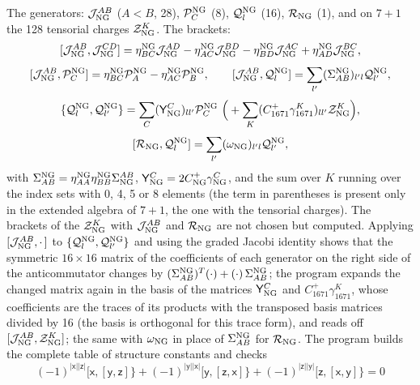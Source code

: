 \documentclass[
  10pt,
]{article}
\begin{document}
The generators: \(\mathcal J^{AB}_{\rm NG}\) (\(A<B\), 28),
\(\mathcal P^{\rm NG}_C\) (8), \(\mathcal Q^{\rm NG}_l\) (16),
\(\mathcal R_{\rm NG}\) (1), and on \(7+1\) the 128 tensorial charges
\(\mathcal Z^K_{\rm NG}\). The brackets:
\[[\mathcal J^{AB}_{\rm NG},\mathcal J^{CD}_{\rm NG}]=\eta^{\rm NG}_{BC}\mathcal J^{AD}_{\rm NG}-\eta^{\rm NG}_{AC}\mathcal J^{BD}_{\rm NG}-\eta^{\rm NG}_{BD}\mathcal J^{AC}_{\rm NG}+\eta^{\rm NG}_{AD}\mathcal J^{BC}_{\rm NG},\]
\[[\mathcal J^{AB}_{\rm NG},\mathcal P^{\rm NG}_C]=\eta^{\rm NG}_{BC}\mathcal P^{\rm NG}_A-\eta^{\rm NG}_{AC}\mathcal P^{\rm NG}_B,\qquad
[\mathcal J^{AB}_{\rm NG},\mathcal Q^{\rm NG}_l]=\sum_{l'}(\Sigma^{\rm NG}_{AB})_{l'l}\mathcal Q^{\rm NG}_{l'},\]
\[\{\mathcal Q^{\rm NG}_l,\mathcal Q^{\rm NG}_{l'}\}=\sum_C(\mathsf Y^C_{\rm NG})_{ll'}\mathcal P^{\rm NG}_C\ \Big(+\sum_K(C^+_{1671}\gamma^K_{1671})_{ll'}\mathcal Z^K_{\rm NG}\Big),\]
\[[\mathcal R_{\rm NG},\mathcal Q^{\rm NG}_l]=\sum_{l'}(\omega_{\rm NG})_{l'l}\mathcal Q^{\rm NG}_{l'},\]
with
\(\Sigma^{\rm NG}_{AB}=\eta^{\rm NG}_{AA}\eta^{\rm NG}_{BB}\Sigma^{AB}_{\rm NG}\),
\(\mathsf Y^C_{\rm NG}=2C^+_{\rm NG}\gamma^C_{\rm NG}\), and the sum
over \(K\) running over the index sets with 0, 4, 5 or 8 elements (the
term in parentheses is present only in the extended algebra of \(7+1\),
the one with the tensorial charges). The brackets of the
\(\mathcal Z^K_{\rm NG}\) with \(\mathcal J^{AB}_{\rm NG}\) and
\(\mathcal R_{\rm NG}\) are not chosen but computed. Applying
\([\mathcal J^{AB}_{\rm NG},\cdot\,]\) to
\(\{\mathcal Q^{\rm NG}_l,\mathcal Q^{\rm NG}_{l'}\}\) and using the
graded Jacobi identity shows that the symmetric \(16\times16\) matrix of
the coefficients of each generator on the right side of the
anticommutator changes by
\((\Sigma^{\rm NG}_{AB})^T(\cdot)+(\cdot)\,\Sigma^{\rm NG}_{AB}\); the
program expands the changed matrix again in the basis of the matrices
\(\mathsf Y^C_{\rm NG}\) and \(C^+_{1671}\gamma^K_{1671}\), whose
coefficients are the traces of its products with the transposed basis
matrices divided by 16 (the basis is orthogonal for this trace form),
and reads off \([\mathcal J^{AB}_{\rm NG},\mathcal Z^K_{\rm NG}]\); the
same with \(\omega_{\rm NG}\) in place of \(\Sigma^{\rm NG}_{AB}\) for
\(\mathcal R_{\rm NG}\). The program builds the complete table of
structure constants and checks
\[(-1)^{\lvert\mathsf x\rvert\lvert\mathsf z\rvert}[\mathsf x,[\mathsf y,\mathsf z]\}+(-1)^{\lvert\mathsf y\rvert\lvert\mathsf x\rvert}[\mathsf y,[\mathsf z,\mathsf x]\}+(-1)^{\lvert\mathsf z\rvert\lvert\mathsf y\rvert}[\mathsf z,[\mathsf x,\mathsf y]\}=0\]
\end{document}
